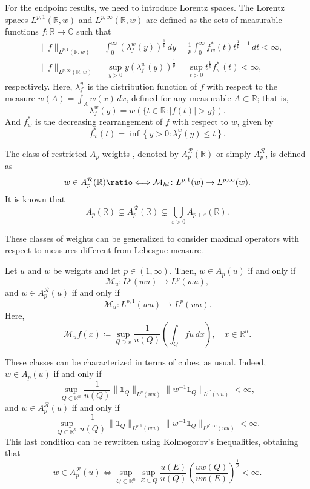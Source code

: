 \documentclass[12pt]{amsart}
\newcommand{\R}{\mathbb{R}}
\newcommand{\C}{\mathbb{C}}
\newcommand*{\longeq}{\ratio\Longleftrightarrow}
\theoremstyle{plain}
\theoremstyle{definition}
\numberwithin{equation}{section}
\begin{document}
For the endpoint results, we need to introduce Lorentz spaces. The Lorentz spaces $L^{p,1}(\R,w)$ and $L^{p,\infty}(\R,w)$ are defined as the sets of measurable functions $f\colon \R\to\C$ such that
\begin{align*}
&\|f\|_{L^{p, 1}(\mathbb{R}, w)}
=
\int_0^{\infty}\left(\lambda_f^w(y)\right)^{\frac{1}{p}} \, dy
=
\frac{1}{p} \int_0^{\infty} f_w^*(t) t^{\frac{1}{p}-1}\, dt
<
\infty,
\\&
\|f\|_{L^{p, \infty}(\mathbb{R}, w)}
=
\sup_{y>0} y\left(\lambda_f^w(y)\right)^{\frac{1}{p}}
=
\sup _{t>0} t^{\frac{1}{p}} f_w^*(t)
<
\infty,
\end{align*}
respectively. Here, $\lambda_f^w$ is the distribution function of $f$ with respect to the measure $w(A)=\int_A w(x)\, dx$, defined for any measurable $A\subset \R$; that is, 
\[
\lambda_f^w(y)
=
w(\{t \in \mathbb{R}:|f(t)|>y\}).
\]
And $f_w^*$ is the decreasing rearrangement of $f$ with respect to $w$, given by 
\[
f_w^*(t)
=
\inf \left\{y>0: \lambda_f^w(y) \leq t\right\}.
\]


The class of restricted $A_p$-weights \cite{KermanTorchinsky, ChungHuntKurtz}, denoted by $A_p^{\mathcal{R}}(\R)$ or simply  $A_p^{\mathcal{R}}$, is defined as
\[
w\in A_p^{\mathcal{R}}(\R)
\longeq
\mathcal{M}_{hl}\colon L^{p,1}(w)\to L^{p,\infty}(w).
\]
It is known \cite{CarroOrtiz} that 
\[
A_p(\R)
\subsetneq 
A_p^{\mathcal{R}}(\R)
\subsetneq
\bigcup_{\varepsilon>0}A_{p+\varepsilon}(\R).
\]





These classes of weights can be generalized to consider maximal operators with respect to measures different from Lebesgue measure.

Let $u$ and $w$ be weights and let $p\in (1,\infty)$. Then, $w\in A_p(u)$ if and only if
\[
\mathcal{M}_{u}
\colon 
L^p(wu)\to L^p(wu),
\]
and $w\in A_p^{\mathcal{R}}(u)$ if and only if
\[
\mathcal{M}_{u}
\colon 
L^{p,1}(wu)\to L^p(wu).
\]
Here, 
\[
\mathcal{M}_{u}f(x)
\coloneqq 
\sup_{Q\ni x}\frac{1}{u(Q)}\left(\int_{Q}fu\, dx\right), \quad x\in\R^n.
\]

These classes can be characterized in terms of cubes, as usual. Indeed, $w\in A_p(u)$ if and only if
\[
\sup_{Q\subset\R^n}\frac{1}{u(Q)}\|\mathds{1}_{Q}\|_{L^p(wu)}\|w^{-1}\mathds{1}_{Q}\|_{L^{p'}(wu)}
<
\infty,
\]
and $w\in A_p^{\mathcal{R}}(u)$ if and only if
\[
\sup_{Q\subset\R^n}\frac{1}{u(Q)}\|\mathds{1}_{Q}\|_{L^{p,1}(wu)}\|w^{-1}\mathds{1}_{Q}\|_{L^{p',\infty}(wu)}
<
\infty.
\]
This last condition can be rewritten using Kolmogorov's inequalities, obtaining that 
\[
w\in A_p^{\mathcal{R}}(u)
\iff 
\sup_{Q\subset\R^n}\sup_{E\subset Q}\frac{u(E)}{u(Q)}\left(\frac{uw(Q)}{uw(E)}\right)^{\frac{1}{p}}
<
\infty.
\]
\end{document}
